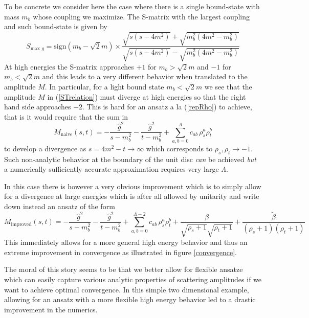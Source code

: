 \documentclass[12pt]{article}
\newcommand{\begBvR}[1]{\begin{#1}}
\newcommand{\beq}{\begBvR{equation}}
\newcommand{\eeq}{\end{equation}}
\newcommand{\la}[1]{\label{#1}}
\newcommand{\<}{{\langle}}
\renewcommand{\>}{{\rangle}}
\begin{document}
To be concrete we consider here the case where there is a single bound-state with mass $m_b$ whose coupling we maximize. The S-matrix with the largest coupling and such bound-state is given by \cite{paperII}
\beq
S_\text{max $g$} =\text{sign}(m_b-\sqrt{2} m)\times  \frac{\sqrt{s (s-4m^2)}+ \sqrt{m_b^2(4m^2-m_b^2)}}{\sqrt{s (s-4m^2)}- \sqrt{m_b^2(4m^2-m_b^2)}} 
\eeq
At high energies the S-matrix approaches $+1$ for $m_b>\sqrt{2}m$ and $-1$ for $m_b<\sqrt{2}m$ and this leads to a very different behavior when translated to the amplitude $M$. In particular, for a light bound state $m_b<\sqrt{2} m$ we see that  the amplitude $M$ in (\ref{STrelation}) must diverge at high energies so that the right hand side approaches $-2$. This is hard for an ansatz a la (\ref{repRho}) to achieve, that is it would require that the sum in 
\beq
M_\text{naive}(s,t) = -\frac{\hat g^2}{s-m_b^2}-\frac{\hat g^2}{t-m_b^2}+ \sum_{a,b=0}^{\Lambda} c_{ab}\, \rho_s^{a}\rho_t^{b} \la{naiveT}
\eeq
to develop a divergence as $s=4m^2-t\to \infty$ which corresponds to $\rho_s, \rho_t \to -1$. Such non-analytic behavior at the boundary of the unit disc \textit{can} be achieved \textit{but} a numerically sufficiently accurate approximation requires very large $\Lambda$.  

In this case there is however a very obvious improvement which is to simply allow for a divergence at large energies which is after all allowed by unitarity and write down instead an ansatz of the form 
\beq
M_\text{improved}(s,t) = -\frac{\hat g^2}{s-m_b^2}-\frac{\hat g^2}{t-m_b^2}+ \sum_{a,b=0}^{\Lambda-2} c_{ab}\, \rho_s^{a}\rho_t^{b} + \frac{\beta}{\sqrt{\rho_s+1}\sqrt{\rho_t+1}}+ \frac{\tilde\beta}{(\rho_s+1)(\rho_t+1)}
 \la{improvedT}
\eeq
This immediately allows for a more general high energy behavior and thus an extreme improvement in convergence as illustrated in figure \ref{convergence}.

The moral of this story seems to be that we better allow for flexible ansatze which can easily capture various analytic properties of scattering amplitudes if we want to achieve optimal convergence. In this simple two dimensional example, allowing for an ansatz with a more flexible high energy behavior led to a drastic
improvement in the numerics. 







	
\end{document}
